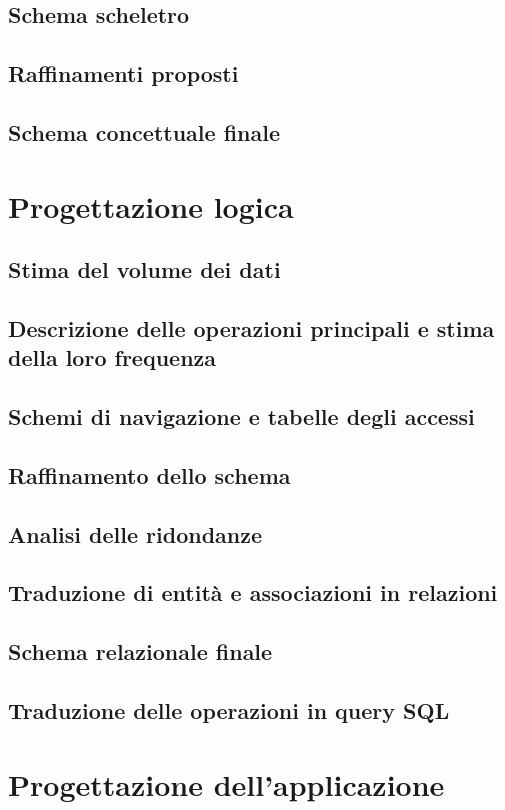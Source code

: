 \documentclass[a4paper,12pt]{report}
\begin{document}
\section{Schema scheletro}
\section{Raffinamenti proposti}
\section{Schema concettuale finale}
\newpage
\chapter{Progettazione logica}
\section{Stima del volume dei dati}
\section{Descrizione delle operazioni principali e stima della loro frequenza}
\section{Schemi di navigazione e tabelle degli accessi}
\section{Raffinamento dello schema}
\section{Analisi delle ridondanze}
\section{Traduzione di entità e associazioni in relazioni}
\section{Schema relazionale finale}
\section{Traduzione delle operazioni in query SQL}
\newpage
\chapter{Progettazione dell'applicazione}
\end{document}
